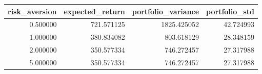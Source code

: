 \begin{tabular}{rrrr}
\toprule
risk\_aversion & expected\_return & portfolio\_variance & portfolio\_std \\
\midrule
0.500000 & 721.571125 & 1825.425052 & 42.724993 \\
1.000000 & 380.834082 & 803.618129 & 28.348159 \\
2.000000 & 350.577334 & 746.272457 & 27.317988 \\
5.000000 & 350.577334 & 746.272457 & 27.317988 \\
\bottomrule
\end{tabular}
